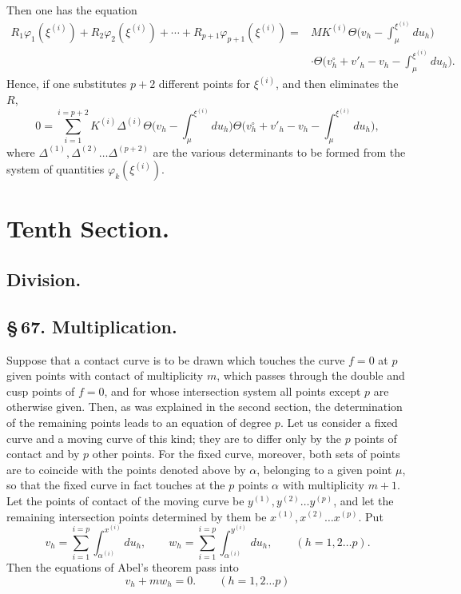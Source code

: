 \documentclass[10pt]{article}
\begin{document}
Then one has the equation
\[
\begin{aligned}
R_1\varphi_1(\xi^{(i)})+R_2\varphi_2(\xi^{(i)})+\cdots+R_{p+1}\varphi_{p+1}(\xi^{(i)})
= {}& M K^{(i)}\Theta\!\biggl(v_h-\int_{\mu}^{\xi^{(i)}}du_h\biggr)\\
&\cdot\Theta\!\biggl(v_h^\circ+v'_h-v_h-\int_{\mu}^{\xi^{(i)}}du_h\biggr).
\end{aligned}
\]
Hence, if one substitutes \(p+2\) different points for \(\xi^{(i)}\), and then eliminates the \(R\),
\[
0=\sum_{i=1}^{i=p+2}K^{(i)}\Delta^{(i)}\Theta\!\biggl(v_h-\int_{\mu}^{\xi^{(i)}}du_h\biggr)\Theta\!\biggl(v_h^\circ+v'_h-v_h-\int_{\mu}^{\xi^{(i)}}du_h\biggr),
\]
where \(\Delta^{(1)},\Delta^{(2)}\ldots\Delta^{(p+2)}\) are the various determinants to be formed from the system of quantities \(\varphi_k(\xi^{(i)})\).
\clearpage

\section*{Tenth Section.}
\subsection*{Division.}

\subsection*{\S\,67. Multiplication.}

Suppose that a contact curve is to be drawn which touches the curve \(f=0\) at \(p\) given points with contact of multiplicity \(m\), which passes through the double and cusp points of \(f=0\), and for whose intersection system all points except \(p\) are otherwise given. Then, as was explained in the second section, the determination of the remaining points leads to an equation of degree \(p\). Let us consider a fixed curve and a moving curve of this kind; they are to differ only by the \(p\) points of contact and by \(p\) other points. For the fixed curve, moreover, both sets of points are to coincide with the points denoted above by \(\alpha\), belonging to a given point \(\mu\), so that the fixed curve in fact touches at the \(p\) points \(\alpha\) with multiplicity \(m+1\). Let the points of contact of the moving curve be \(y^{(1)},y^{(2)}\ldots y^{(p)}\), and let the remaining intersection points determined by them be \(x^{(1)},x^{(2)}\ldots x^{(p)}\). Put
\[
v_h=\sum_{i=1}^{i=p}\int_{\alpha^{(i)}}^{x^{(i)}}du_h,\qquad
w_h=\sum_{i=1}^{i=p}\int_{\alpha^{(i)}}^{y^{(i)}}du_h,\qquad
(h=1,2\ldots p).
\]
Then the equations of Abel's theorem pass into
\[
v_h+mw_h=0.\qquad(h=1,2\ldots p)
\]
\end{document}
